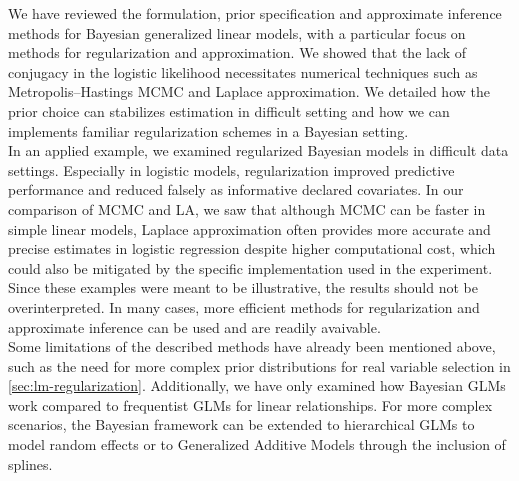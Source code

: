 We have reviewed the formulation, prior specification and approximate inference methods for Bayesian generalized linear models, with a particular focus on methods for regularization and approximation.
We showed that the lack of conjugacy in the logistic likelihood necessitates numerical techniques such as Metropolis–Hastings MCMC and Laplace approximation.
We detailed how the prior choice can stabilizes estimation in difficult setting and how we can implements familiar regularization schemes in a Bayesian setting.\\

In an applied example, we examined regularized Bayesian models in difficult data settings. Especially in logistic models, regularization improved predictive performance and reduced falsely as informative declared covariates.
In our comparison of MCMC and LA, we saw that although MCMC can be faster in simple linear models, Laplace approximation often provides more accurate and precise estimates in logistic regression despite higher computational cost, which could also be mitigated by the specific implementation used in the experiment.
Since these examples were meant to be illustrative, the results should not be overinterpreted. In many cases, more efficient methods for regularization and approximate inference can be used and are readily avaivable.\\

Some limitations of the described methods have already been mentioned above, such as the need for more complex prior distributions for real variable selection in \autoref{sec:lm-regularization}.
Additionally, we have only examined how Bayesian GLMs work compared to frequentist GLMs for linear relationships.
For more complex scenarios, the Bayesian framework can be extended to hierarchical GLMs to model random effects or to Generalized Additive Models through the inclusion of splines. 
